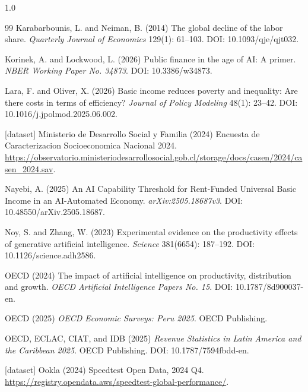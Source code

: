 \documentclass[11pt,a4paper]{article}
\begin{document}
\begin{spacing}{1.0}
\begin{thebibliography}{99}
Karabarbounis, L. and Neiman, B. (2014)
\newblock The global decline of the labor share.
\newblock \emph{Quarterly Journal of Economics} 129(1): 61--103. DOI: 10.1093/qje/qjt032.

Korinek, A. and Lockwood, L. (2026)
\newblock Public finance in the age of AI: A primer.
\newblock \emph{NBER Working Paper No. 34873}. DOI: 10.3386/w34873.

Lara, F. and Oliver, X. (2026)
\newblock Basic income reduces poverty and inequality: Are there costs in terms of efficiency?
\newblock \emph{Journal of Policy Modeling} 48(1): 23--42. DOI: 10.1016/j.jpolmod.2025.06.002.



[dataset] Ministerio de Desarrollo Social y Familia (2024)
\newblock Encuesta de Caracterizacion Socioeconomica Nacional 2024.
\newblock \url{https://observatorio.ministeriodesarrollosocial.gob.cl/storage/docs/casen/2024/casen_2024.sav}.

Nayebi, A. (2025)
\newblock An AI Capability Threshold for Rent-Funded Universal Basic Income in an AI-Automated Economy.
\newblock \emph{arXiv:2505.18687v3}. DOI: 10.48550/arXiv.2505.18687.

Noy, S. and Zhang, W. (2023)
\newblock Experimental evidence on the productivity effects of generative artificial intelligence.
\newblock \emph{Science} 381(6654): 187--192. DOI: 10.1126/science.adh2586.

OECD (2024)
\newblock The impact of artificial intelligence on productivity, distribution and growth.
\newblock \emph{OECD Artificial Intelligence Papers No. 15}. DOI: 10.1787/8d900037-en.

OECD (2025)
\newblock \emph{OECD Economic Surveys: Peru 2025}.
\newblock OECD Publishing.

OECD, ECLAC, CIAT, and IDB (2025)
\newblock \emph{Revenue Statistics in Latin America and the Caribbean 2025}.
\newblock OECD Publishing. DOI: 10.1787/7594fbdd-en.

[dataset] Ookla (2024)
\newblock Speedtest Open Data, 2024 Q4.
\newblock \url{https://registry.opendata.aws/speedtest-global-performance/}.



\end{thebibliography}
\end{spacing}
\end{document}
